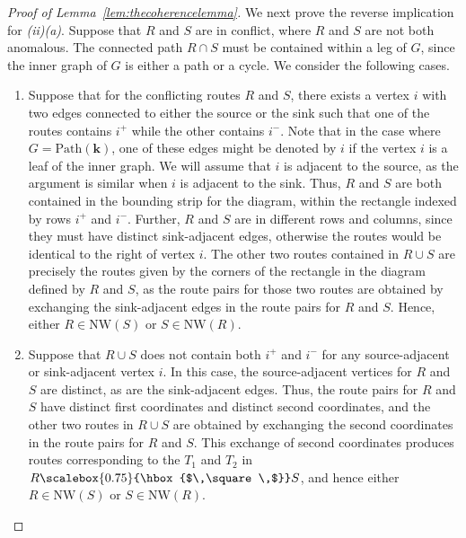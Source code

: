 \documentclass[12pt]{amsart}
\theoremstyle{definition}
\newcommand\bk{\mathbf{k}}
\newcommand\Path{\mathrm{Path}}
\newcommand\NW{\mathrm{NW}}
\newcommand\squarette{\scalebox{0.75}{\hbox{$\,\square\,$}}}
\begin{document}
\begin{proof}[Proof of Lemma~\ref{lem:thecoherencelemma}]
We next prove the reverse implication for \textit{(ii)(a)}.
Suppose that $R$ and $S$ are in conflict, where $R$ and $S$ are not both anomalous.
The connected path $R\cap S$ must be contained within a leg of $G$, since the inner graph of $G$ is either a path or a cycle.
We consider the following cases.
\begin{enumerate}
    \item Suppose that for the conflicting routes $R$ and $S$, there exists a vertex $i$ with two edges connected to either the source or the sink such that one of the routes contains $i^+$ while the other contains $i^-$.
    Note that in the case where $G=\Path(\bk)$, one of these edges might be denoted by $i$ if the vertex $i$ is a leaf of the inner graph.
    We will assume that $i$ is adjacent to the source, as the argument is similar when $i$ is adjacent to the sink.
    Thus, $R$ and $S$ are both contained in the bounding strip for the diagram, within the rectangle indexed by rows $i^+$ and $i^-$.
    Further, $R$ and $S$ are in different rows and columns, since they must have distinct sink-adjacent edges, otherwise the routes would be identical to the right of vertex $i$.
    The other two routes contained in $R\cup S$ are precisely the routes given by the corners of the rectangle in the diagram defined by $R$ and $S$, as the route pairs for those two routes are obtained by exchanging the sink-adjacent edges in the route pairs for $R$ and $S$.
    Hence, either $R\in \NW(S)$ or $S\in \NW(R)$.
    \item Suppose that $R\cup S$ does not contain both $i^+$ and $i^-$ for any source-adjacent or sink-adjacent vertex $i$.
    In this case, the source-adjacent vertices for $R$ and $S$ are distinct, as are the sink-adjacent edges.
    Thus, the route pairs for $R$ and $S$ have distinct first coordinates and distinct second coordinates, and the other two routes in $R\cup S$ are obtained by exchanging the second coordinates in the route pairs for $R$ and $S$.
    This exchange of second coordinates produces routes corresponding to the $T_1$ and $T_2$ in $R\squarette S$, and hence either $R\in \NW(S)$ or $S\in \NW(R)$.
\end{enumerate}


\end{proof}
\end{document}
